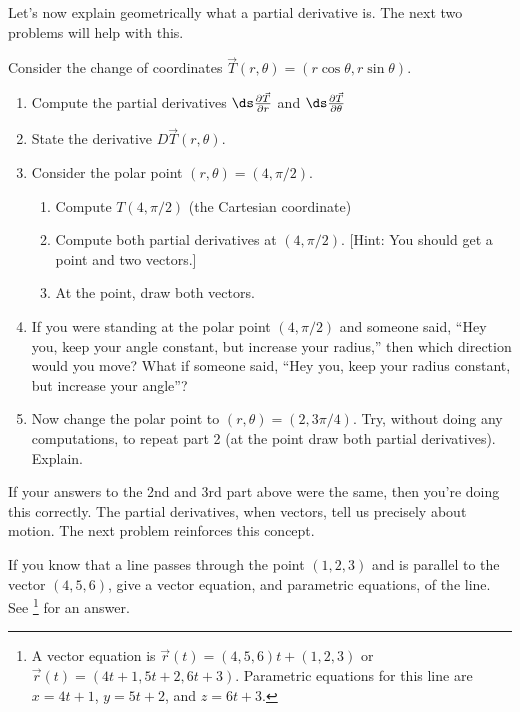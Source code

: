 Let's now explain geometrically what a partial derivative is. The next two problems will help with this.
\begin{problem}
 Consider the change of coordinates $\vec T(r,\theta) = (r\cos \theta, r\sin \theta)$.
\begin{enumerate}
	\item Compute the partial derivatives $\ds\frac{\partial \vec T}{\partial r}$ and $\ds\frac{\partial \vec T}{\partial \theta}$
	\item State the derivative $D\vec T(r,\theta)$. \\
	[Hint: If you get a 2 by 2 matrix, then you're on the right track. Each partial derivative is a vector.  (This one is in the \derivativehomeworklink{handwritten file} with extra practice.)]
	\item Consider the polar point $(r,\theta) = (4,\pi/2)$. 
	\begin{enumerate}
		\item Compute $T(4,\pi/2)$ (the Cartesian coordinate)
		\item Compute both partial derivatives at $(4,\pi/2)$. [Hint: You should get a point and two vectors.]
		\item At the point, draw both vectors.
	\end{enumerate}
 \item If you were standing at the polar point $(4,\pi/2)$ and someone said, ``Hey you, keep your angle constant, but increase your radius,'' then which direction would you move?  What if someone said, ``Hey you, keep your radius constant, but increase your angle''?
 \item Now change the polar point to $(r,\theta) = (2,3\pi/4)$.  Try, without doing  any computations, to repeat part 2 (at the point draw both partial derivatives). Explain.
\end{enumerate}
\end{problem}

If your answers to the 2nd and 3rd part above were the same, then you're doing this correctly.  The partial derivatives, when vectors, tell us precisely about motion. The next problem reinforces this concept.

\begin{review*}
 If you know that a line passes through the point $(1,2,3)$ and is parallel to the vector $(4,5,6)$, give a vector equation, and parametric equations, of the line. See \footnote{A vector equation is $\vec r(t) = (4,5,6)t+(1,2,3)$ or $\vec r(t) = (4t+1, 5t+2, 6t+3)$.  Parametric equations for this line are 
$x=4t+1$, $y=5t+2$, and $z=6t+3$. 
} for an answer.
\end{review*}



